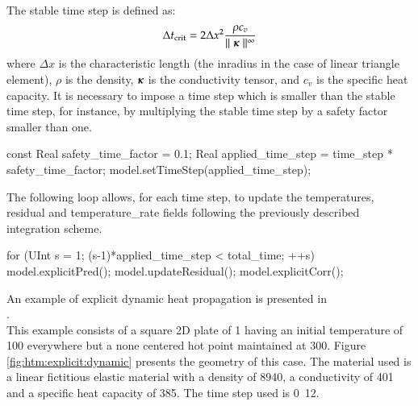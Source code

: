 The stable time step is defined as:
\begin{equation}\label{eqn:htm:explicit:stabletime}
  \Delta t_{{\mathrm{crit}}} = 2 \Delta x^2 \frac{\rho c_v}{\mid\mid \boldsymbol{\kappa} \mid\mid^\infty}
\end{equation}
where $\Delta  x$ is the characteristic length (\eg  the inradius in the  case of
linear triangle  element), $\rho$ is the density, $\boldsymbol{\kappa}$ is the conductivity tensor,
and $c_v$ is the specific heat capacity. It is
necessary to impose a time step which is smaller than the stable time step, for
instance, by  multiplying the stable time  step by a safety  factor smaller than
one.

\begin{cpp}
  const Real safety_time_factor = 0.1;
  Real applied_time_step = time_step * safety_time_factor;
  model.setTimeStep(applied_time_step);
\end{cpp}


The following loop  allows, for each time  step, to update the  temperatures, residual and
temperature\_rate  fields  following the previously described integration scheme.

\begin{cpp}
  for (UInt s = 1; (s-1)*applied_time_step < total_time; ++s) {
    model.explicitPred();
    model.updateResidual();
    model.explicitCorr();
  }
\end{cpp}

An    example    of    explicit     dynamic    heat propagation is    presented    in \\
.  \\
This example  consists of a square 2D plate of \unit{1}{\squaremetre}
having an initial temperature of \unit{100}{\kelvin} everywhere but a none centered hot point
maintained at \unit{300}{\kelvin}. Figure \ref{fig:htm:explicit:dynamic} presents the
geometry of this case. The material used is a linear fictitious elastic material
with  a density  of  \unit{8940}{\kilogrampercubicmetre}, a  conductivity of
\unit{401}{\watt\per\metre\per\kelvin} and a specific heat capacity of \unit{385}{\joule\per\kelvin\per\kilogram}. The time step used is \unit{0.12}{\second}.

